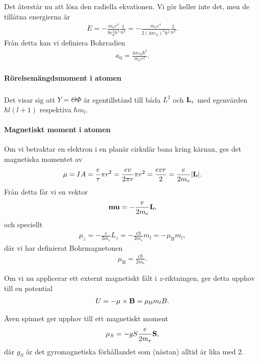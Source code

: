 Det återstår nu att lösa den radiella ekvationen. Vi gör heller inte det, men de tillåtna energierna är
\begin{align*}
	E = -\frac{m_{e}e^{4}}{8\varepsilon_{0}^{2}h^{2}}\frac{1}{n^{2}} = -\frac{m_{e}e^{4}}{2(4\pi\varepsilon_{0})^{2}\hbar^{2}}\frac{1}{n^{2}}.
\end{align*}
Från detta kan vi definiera Bohrradien
\begin{align*}
	a_{0} = \frac{4\pi\varepsilon_{0}\hbar^{2}}{m_{e}e^{2}}.
\end{align*}

\paragraph{Rörelsemängdsmoment i atomen}
Det visar sig att $Y = \Theta\Phi$ är egentillstånd till båda $\hat{L^{2}}$ och $\vb{L}_{z}$ med egenvärden $\hbar l(l + 1)$ respektiva $\hbar m_{l}$.

\paragraph{Magnetiskt moment i atomen}
Om vi betraktar en elektron i en planär cirkulär bana kring kärnan, ges det magnetiska momentet av
\begin{align*}
	\mu = IA = \frac{e}{\tau}\pi r^{2} = \frac{ev}{2\pi r}\pi r^{2} = \frac{evr}{2} = \frac{e}{2m_{e}}\abs{\vb{L}}.
\end{align*}
Från detta får vi en vektor
\begin{align*}
	\vb{mu} = -\frac{e}{2m_{e}}\vb{L},
\end{align*}
och speciellt
\begin{align*}
	\mu_{z} = -\frac{e}{2m_{e}}L_{z} = -\frac{e\hbar}{2m_{e}}m_{l} = -\mu_{\text{B}}m_{l},
\end{align*}
där vi har definierat Bohrmagnetonen
\begin{align*}
	\mu_{\text{B}} = \frac{e\hbar}{2m_{e}}.
\end{align*}

Om vi nu applicerar ett externt magnetiskt fält i $z$-riktningen, ger detta upphov till en potential
\begin{align*}
	U = -\vb{\mu}\times\vb{B} = \mu_{\text{B}}m_{l}B.
\end{align*}

Även spinnet ger upphov till ett magnetiskt moment
\begin{align*}
	\vb{\mu}_{S} = -g{S}\frac{e}{2m_{e}}\vb{S},
\end{align*}
där $g_{S}$ är det gyromagnetiska förhållandet som (nästan) alltid är lika med $2$.

